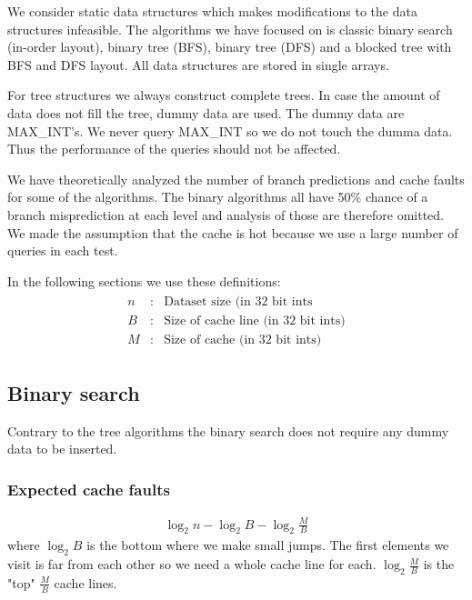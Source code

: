 We consider static data structures which makes modifications to the data structures infeasible.
The algorithms we have focused on is classic binary search (in-order layout), binary tree (BFS), binary tree (DFS) and a blocked tree with BFS and DFS layout. All data structures are stored in single arrays.

For tree structures we always construct complete trees. In case the amount of data does not fill the tree, dummy data are used. The dummy data are MAX\_INT's. We never query MAX\_INT so we do not touch the dumma data. Thus the performance of the queries should not be affected.

We have theoretically analyzed the number of branch predictions and cache faults for some of the algorithms. The binary algorithms all have 50\% chance of a branch misprediction at each level and analysis of those are therefore omitted. We made the assumption that the cache is hot because we use a large number of queries in each test.

In the following sections we use these definitions:
\begin{eqnarray*}
\begin{array}{rcl}
n & : & \textrm{Dataset size (in 32 bit ints} \\
B & : & \textrm{Size of cache line (in 32 bit ints)} \\
M & : & \textrm{Size of cache (in 32 bit ints)}
\end{array}
\end{eqnarray*}

\subsection{Binary search}

Contrary to the tree algorithms the binary search does not require any dummy data to be inserted.

\subsubsection*{Expected cache faults}


\begin{eqnarray*}
\log_2 n - \log_2 B - \log_2 \frac{M}{B} 
\end{eqnarray*}
where $\log_2 B$ is the bottom where we make small jumps. The first elements we visit is far from each other so we need a whole cache line for each. $\log_2 \frac{M}{B}$ is the "top" $\frac{M}{B}$ cache lines.


